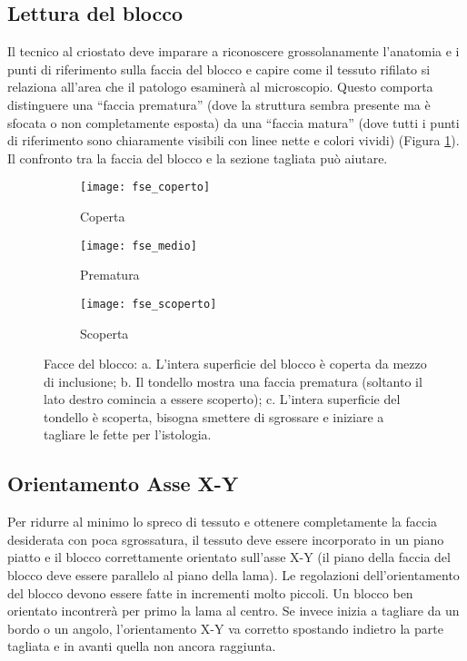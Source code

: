 \subsection{Lettura del blocco}
Il tecnico al criostato deve imparare a riconoscere grossolanamente l'anatomia e i punti di riferimento sulla faccia del blocco e capire come il tessuto rifilato si relaziona all'area che il patologo esaminerà al microscopio. Questo comporta distinguere una ``faccia prematura'' (dove la struttura sembra presente ma è sfocata o non completamente esposta) da una ``faccia matura'' (dove tutti i punti di riferimento sono chiaramente visibili con linee nette e colori vividi) (Figura \ref{fig:faccia}). Il confronto tra la faccia del blocco e la sezione tagliata può aiutare. 

 \begin{figure}[htpb]
      \centering
    \begin{subfigure}[b]{0.32\textwidth}
    \texttt{[image: fse\_coperto]}
      \caption{Coperta}
    \end{subfigure}
    \begin{subfigure}[b]{0.32\textwidth}
    \texttt{[image: fse\_medio]}
      \caption{Prematura}
    \end{subfigure}
    \begin{subfigure}[b]{0.32\textwidth}
    \texttt{[image: fse\_scoperto]}
      \caption{Scoperta}
    \end{subfigure}
\caption{Facce del blocco: a. L'intera superficie del blocco è coperta da mezzo di inclusione; b. Il tondello mostra una faccia prematura (soltanto il lato destro comincia a essere scoperto); c. L'intera superficie del tondello è scoperta, bisogna smettere di sgrossare e iniziare a tagliare le fette per l'istologia.}
\label{fig:faccia}
\end{figure}

\subsection{Orientamento Asse X-Y}
Per ridurre al minimo lo spreco di tessuto e ottenere completamente la faccia desiderata con poca sgrossatura, il tessuto deve essere incorporato in un piano piatto e il blocco correttamente orientato sull'asse X-Y (il piano della faccia del blocco deve essere parallelo al piano della lama).
Le regolazioni dell'orientamento del blocco devono essere fatte in incrementi molto piccoli. Un blocco ben orientato incontrerà per primo la lama al centro. Se invece inizia a tagliare da un bordo o un angolo, l'orientamento X-Y va corretto spostando indietro la parte tagliata e in avanti quella non ancora raggiunta. 

